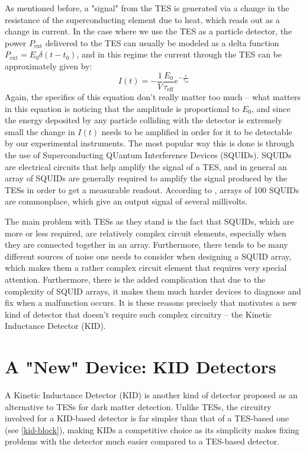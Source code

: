 As mentioned before, a "signal" from the TES is generated via a change in the resistance of the
superconducting element due to heat, which reads out as a change in current. In the case where we use the TES
as a particle detector, the power \( P_\text{ext} \) delivered to the TES can usually be modeled as a delta 
function \( P_\text{ext} = E_0 \delta(t - t_0) \), and in this regime the current through the TES can be
approximately given by:
\[
	I(t) = -\frac{1}{V} \frac{E_0}{\tau_\text{eff}}e^{-\frac{t}{\tau_\text{eff}}}
\]
Again, the specifics of this equation don't really matter too much -- what matters in this equation is
noticing that the amplitude is proportional to \( E_0 \), and since the energy deposited by any particle
colliding with the detector is extremely small the change in \( I(t) \) needs to be amplified in order for it
to be detectable by our experimental instruments. The most popular way this is done is through the use of
Superconducting QUantum Interference Devices (SQUIDs). SQUIDs are electrical circuits that help amplify the
signal of a TES, and in general an array of SQUIDs are generally required to amplify the signal produced by
the TESs in order to get a measurable readout. According to \cite{luciaTransitionEdgeSensors2024}, arrays of
100 SQUIDs are commonplace, which give an output signal of several millivolts. 

The main problem with TESs as they stand is the fact that SQUIDs, which are more or less required, are
relatively complex circuit elements, especially when they are connected together in an array.   
Furthermore, there tends to be many
different sources of noise one needs to consider when designing a SQUID array, which makes them a rather
complex circuit element that requires very special attention. Furthermore, there is the added complication
that due to the complexity of SQUID arrays, it makes them much harder devices to diagnose and fix when a
malfunction occurs. It is these reasons precisely that motivates a new kind of detector that doesn't require
such complex circuitry -- the Kinetic Inductance Detector (KID). 
 

\section{A "New" Device: KID Detectors}
\label{KID}

A Kinetic Inductance Detector (KID) is another kind of detector proposed as an alternative to TESs for dark
matter detection. Unlike TESs, the circuitry involved for a KID-based detector is far simpler than that of a
TES-based one (see \cref{kid-block}), making KIDs a competitive choice as its simplicity makes fixing 
problems with the detector much easier compared to a TES-based detector. 
 
